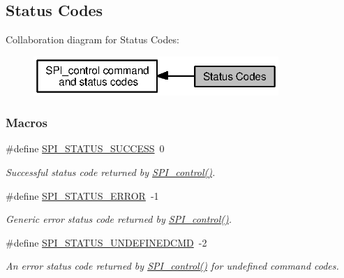 \subsection{Status Codes}
\label{group___s_p_i___s_t_a_t_u_s}
Collaboration diagram for Status Codes\+:
\nopagebreak
\begin{figure}[H]
\begin{center}
\leavevmode
\includegraphics[width=263pt]{group___s_p_i___s_t_a_t_u_s}
\end{center}
\end{figure}
\subsubsection*{Macros}
\begin{DoxyCompactItemize}
\item 
\#define \hyperlink{group___s_p_i___s_t_a_t_u_s_gab38fa90ff62128dbc98b2ecd84ca106f}{S\+P\+I\+\_\+\+S\+T\+A\+T\+U\+S\+\_\+\+S\+U\+C\+C\+E\+S\+S}~0
\begin{DoxyCompactList}\small\item\em Successful status code returned by \hyperlink{_s_p_i_8h_ab9d3a23991be2741f382749d3844cc2f}{S\+P\+I\+\_\+control()}. \end{DoxyCompactList}\item 
\#define \hyperlink{group___s_p_i___s_t_a_t_u_s_ga2d0020dd673cc28a9e1c20b0ff101073}{S\+P\+I\+\_\+\+S\+T\+A\+T\+U\+S\+\_\+\+E\+R\+R\+O\+R}~-\/1
\begin{DoxyCompactList}\small\item\em Generic error status code returned by \hyperlink{_s_p_i_8h_ab9d3a23991be2741f382749d3844cc2f}{S\+P\+I\+\_\+control()}. \end{DoxyCompactList}\item 
\#define \hyperlink{group___s_p_i___s_t_a_t_u_s_gacfcd15e1eecdb99b4867adc7592a8d6e}{S\+P\+I\+\_\+\+S\+T\+A\+T\+U\+S\+\_\+\+U\+N\+D\+E\+F\+I\+N\+E\+D\+C\+M\+D}~-\/2
\begin{DoxyCompactList}\small\item\em An error status code returned by \hyperlink{_s_p_i_8h_ab9d3a23991be2741f382749d3844cc2f}{S\+P\+I\+\_\+control()} for undefined command codes. \end{DoxyCompactList}\end{DoxyCompactItemize}


